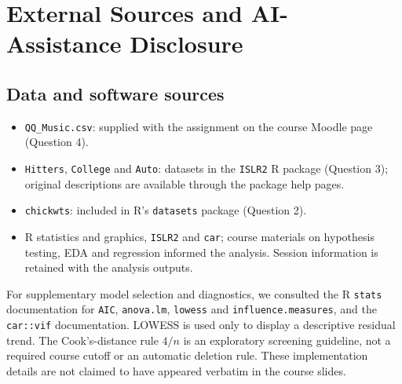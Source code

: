 \section*{External Sources and AI-Assistance Disclosure}
\FloatBarrier
\subsection*{Data and software sources}
\begin{itemize}\setlength\itemsep{2pt}
\item \texttt{QQ\_Music.csv}: supplied with the assignment on the course Moodle page (Question 4).
\item \texttt{Hitters}, \texttt{College} and \texttt{Auto}: datasets in the \texttt{ISLR2} R package (Question 3); original descriptions are available through the package help pages.
\item \texttt{chickwts}: included in R's \texttt{datasets} package (Question 2).
\item R statistics and graphics, \texttt{ISLR2} and \texttt{car}; course materials on hypothesis testing, EDA and regression informed the analysis. Session information is retained with the analysis outputs.
\end{itemize}

For supplementary model selection and diagnostics, we consulted the R \texttt{stats} documentation for \texttt{AIC}, \texttt{anova.lm}, \texttt{lowess} and \texttt{influence.measures}, and the \texttt{car::vif} documentation. LOWESS is used only to display a descriptive residual trend. The Cook's-distance rule $4/n$ is an exploratory screening guideline, not a required course cutoff or an automatic deletion rule. These implementation details are not claimed to have appeared verbatim in the course slides.
\FloatBarrier
